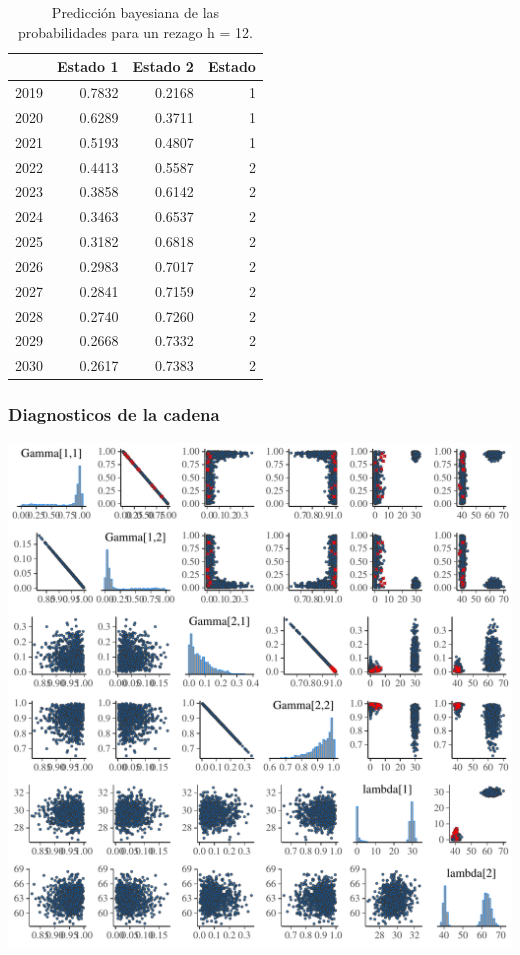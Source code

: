 \documentclass[a4paper]{article}\usepackage[]{graphicx}\usepackage[]{color}
\makeatletter
\def\maxwidth{ %
  \ifdim\Gin@nat@width>\linewidth
    \linewidth
  \else
    \Gin@nat@width
  \fi
}
\newenvironment{knitrout}{}{} %
\makeatother
\begin{document}
\begin{table}[ht]
\centering
\begin{tabular}{rrrr}
  \hline
 & Estado 1 & Estado 2 & Estado \\ 
  \hline
2019 & 0.7832 & 0.2168 &     1 \\ 
  2020 & 0.6289 & 0.3711 &     1 \\ 
  2021 & 0.5193 & 0.4807 &     1 \\ 
  2022 & 0.4413 & 0.5587 &     2 \\ 
  2023 & 0.3858 & 0.6142 &     2 \\ 
  2024 & 0.3463 & 0.6537 &     2 \\ 
  2025 & 0.3182 & 0.6818 &     2 \\ 
  2026 & 0.2983 & 0.7017 &     2 \\ 
  2027 & 0.2841 & 0.7159 &     2 \\ 
  2028 & 0.2740 & 0.7260 &     2 \\ 
  2029 & 0.2668 & 0.7332 &     2 \\ 
  2030 & 0.2617 & 0.7383 &     2 \\ 
   \hline
\end{tabular}
\caption{Predicción bayesiana de las probabilidades para un rezago h = 12.} 
\end{table}


\subsubsection*{Diagnosticos de la cadena}

\begin{knitrout}
\color{fgcolor}
\includegraphics[width=\maxwidth]{figure/unnamed-chunk-29-1} 

\end{knitrout}
\end{document}
